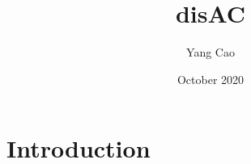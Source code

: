 \documentclass{article}
\title{disAC}
\author{Yang Cao}
\date{October 2020}
\begin{document}
\maketitle

\section{Introduction}
\end{document}
